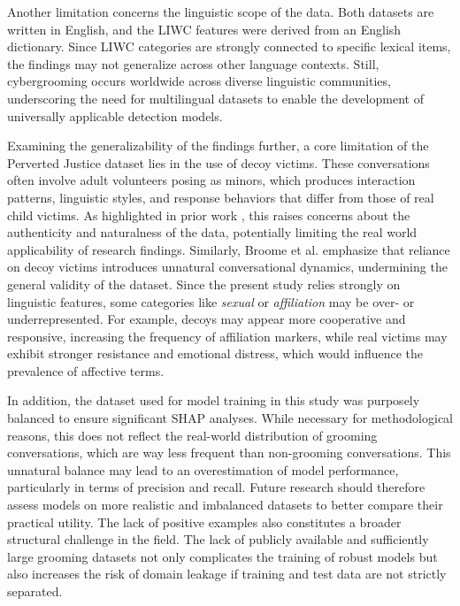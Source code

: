 Another limitation concerns the linguistic scope of the data. Both datasets are written in English, and the LIWC features were derived from an English dictionary. Since LIWC categories are strongly connected to specific lexical items, the findings may not generalize across other language contexts. Still, cybergrooming occurs worldwide across diverse linguistic communities, underscoring the need for multilingual datasets to enable the development of universally applicable detection models.  

Examining the generalizability of the findings further, a core limitation of the Perverted Justice dataset lies in the use of decoy victims. These conversations often involve adult volunteers posing as minors, which produces interaction patterns, linguistic styles, and response behaviors that differ from those of real child victims. As highlighted in prior work \cite{chiangandgrant2017online}, this raises concerns about the authenticity and naturalness of the data, potentially limiting the real world applicability of research findings. Similarly, Broome et al. \cite{broome2020psycholinguistic} emphasize that reliance on decoy victims introduces unnatural conversational dynamics, undermining the general validity of the dataset. Since the present study relies strongly on linguistic features, some categories like \textit{sexual} or \textit{affiliation} may be over- or underrepresented. For example, decoys may appear more cooperative and responsive, increasing the frequency of affiliation markers, while real victims may exhibit stronger resistance and emotional distress, which would influence the prevalence of affective terms.  

In addition, the dataset used for model training in this study was purposely balanced to ensure significant SHAP analyses. While necessary for methodological reasons, this does not reflect the real-world distribution of grooming conversations, which are way less frequent than non-grooming conversations. This unnatural balance may lead to an overestimation of model performance, particularly in terms of precision and recall. Future research should therefore assess models on more realistic and imbalanced datasets to better compare their practical utility. The lack of positive examples also constitutes a broader structural challenge in the field. The lack of publicly available and sufficiently large grooming datasets not only complicates the training of robust models but also increases the risk of domain leakage if training and test data are not strictly separated.  

